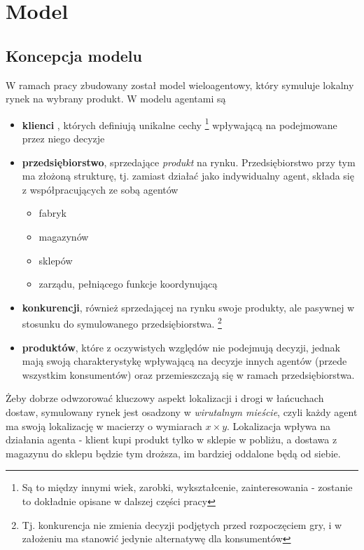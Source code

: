 \documentclass{article}
\begin{document}
\section{Model}
\subsection{Koncepcja modelu}


W ramach pracy zbudowany został model wieloagentowy, który symuluje lokalny rynek na wybrany produkt. W modelu agentami są 
\begin{itemize} 
	\item \textbf{klienci} , których definiują unikalne cechy \footnote{Są to między innymi wiek, zarobki, wykształcenie, zainteresowania - zostanie to dokładnie opisane w dalszej części pracy}  wpływającą na podejmowane przez niego decyzje 
	\item \textbf{przedsiębiorstwo}, sprzedające \textit{produkt} na rynku. Przedsiębiorstwo przy tym ma złożoną strukturę, tj. zamiast działać jako indywidualny agent, składa się z współpracujących ze sobą agentów 
		\begin{itemize}
			\item fabryk
			\item magazynów
			\item sklepów 
			\item zarządu, pełniącego funkcje koordynującą 
		\end{itemize}
	\item \textbf{konkurencji}, również sprzedającej na rynku swoje produkty, ale pasywnej w stosunku do symulowanego przedsiębiorstwa. \footnote{Tj. konkurencja nie zmienia decyzji podjętych przed rozpoczęciem gry, i w założeniu ma stanowić jedynie alternatywę dla konsumentów} 
	\item \textbf{produktów}, które z oczywistych względów nie podejmują decyzji, jednak mają swoją charakterystykę wpływającą na decyzje innych agentów (przede wszystkim konsumentów) oraz przemieszczają się w ramach przedsiębiorstwa. 
\end{itemize}


Żeby dobrze odwzorować kluczowy aspekt lokalizacji i drogi w łańcuchach dostaw, symulowany rynek jest osadzony w \textit{wirutalnym mieście}, czyli każdy agent ma swoją lokalizację w macierzy o wymiarach $x \times y$. Lokalizacja wpływa na działania agenta - klient kupi produkt tylko w sklepie w pobliżu, a dostawa z magazynu do sklepu będzie tym droższa, im bardziej oddalone będą od siebie. 
\end{document}
